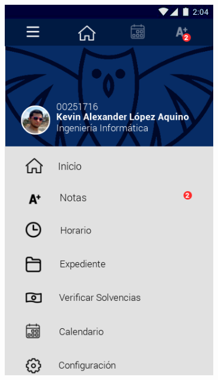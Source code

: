\documentclass[12pt]{article}
\begin{document}
\begin{figure}[t]
\begin{minipage}[t]{0.45\textwidth}
		\includegraphics[width=0.825\textwidth]{img/5.png}
	\end{minipage}
\end{figure}
\end{document}
